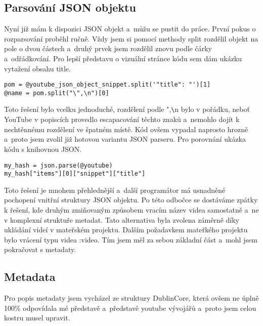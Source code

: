 \subsection{Parsování JSON objektu}
\par Nyní již mám k dispozici JSON objekt a~můžu se pustit do práce. První pokus o rozparsování proběhl ručně. Vždy jsem si pomocí methody split rozdělil objekt na pole o dvou částech a~druhý prvek jsem rozdělil znovu podle čárky a~odřádkování. Pro lepší představu o vizuální stránce kódu sem dám ukázku vytažení obsahu title.
\begin{verbatim}
pom = @youtube_json_object_snippet.split('"title": "')[1]
@name = pom.split("\",\n")[0]
\end{verbatim}
\par Toto řešení bylo vcelku jednoduché, rozdělení podle ",\verb|\|n bylo v pořádku, neboť YouTube v popiscích provedlo escapacování těchto znaků a~nemohlo dojít k nechtěnnému rozdělení ve špatném místě. Kód ovšem vypadal naprosto hrozně a~proto jsem zvolil již hotovou variantu JSON parseru. Pro porovnání ukázka kódu s knihovnou JSON.
\begin{verbatim}
my_hash = json.parse(@youtube)
my_hash["items"][0]["snippet"]["title"]
\end{verbatim}

\par Toto řešení je mnohem přehlednější a~další programátor má usnadněné pochopení vnitřní struktury JSON objektu. Po této odbočce se dostáváme zpátky k řešení, kde druhým zmiňovaným způsobem vracím název videa samostatně a~ne v komplexní struktuře metadat. Tato alternativa byla zvolena záměrně díky ukládání videí v mateřském projektu. Dalším požadavkem mateřkého projektu bylo vrácení typu videa :video. Tím jsem měl za sebou základní část a~mohl jsem pokračovat s metadaty.

\subsection{Metadata}

\par Pro popis metadaty jsem vycházel ze struktury DublinCore, která ovšem ne úplně 100\% odpovídala mé představě a~představě youtube vývojářů a~proto jsem celou kostru musel upravit. 

